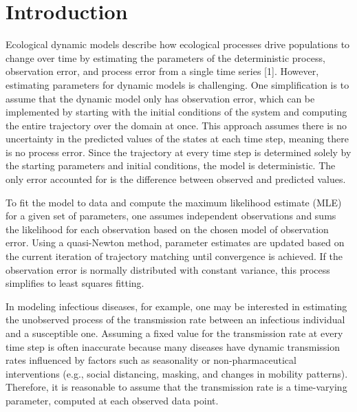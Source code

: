 \documentclass[
11pt, %
oneside, %
english, %
singlespacing, %
]{macthesis} %
\begin{document}
\label{lastoffront}
\clearpage


\mainmatter %
\pagestyle{thesis}
\chapter{Introduction}\label{introduction}

Ecological dynamic models describe how ecological processes drive populations to change over time by estimating the parameters of the deterministic process, observation error, and process error from a single time series {[}1{]}. However, estimating parameters for dynamic models is challenging. One simplification is to assume that the dynamic model only has observation error, which can be implemented by starting with the initial conditions of the system and computing the entire trajectory over the domain at once. This approach assumes there is no uncertainty in the predicted values of the states at each time step, meaning there is no process error. Since the trajectory at every time step is determined solely by the starting parameters and initial conditions, the model is deterministic. The only error accounted for is the difference between observed and predicted values.

To fit the model to data and compute the maximum likelihood estimate (MLE) for a given set of parameters, one assumes independent observations and sums the likelihood for each observation based on the chosen model of observation error. Using a quasi-Newton method, parameter estimates are updated based on the current iteration of trajectory matching until convergence is achieved. If the observation error is normally distributed with constant variance, this process simplifies to least squares fitting.

In modeling infectious diseases, for example, one may be interested in estimating the unobserved process of the transmission rate between an infectious individual and a susceptible one. Assuming a fixed value for the transmission rate at every time step is often inaccurate because many diseases have dynamic transmission rates influenced by factors such as seasonality or non-pharmaceutical interventions (e.g., social distancing, masking, and changes in mobility patterns). Therefore, it is reasonable to assume that the transmission rate is a time-varying parameter, computed at each observed data point.
\end{document}
